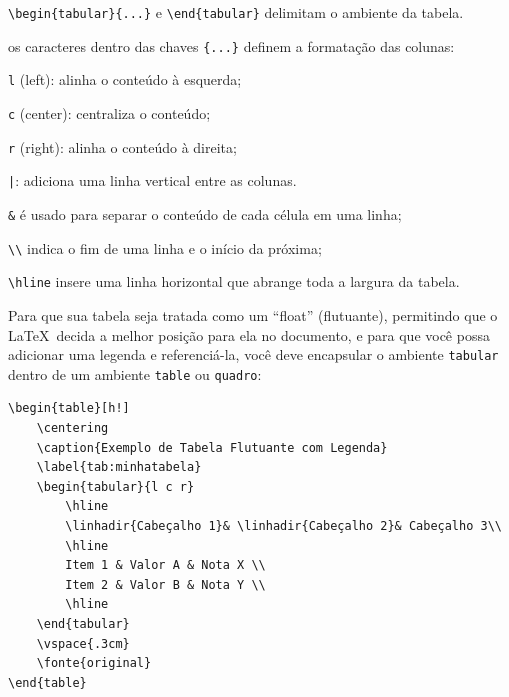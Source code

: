 \begin{alineas}
	\item \texttt{\textbackslash begin\{tabular\}\{...\}} e \texttt{\textbackslash end\{tabular\}} delimitam o ambiente da tabela.
	\item os caracteres dentro das chaves \texttt{\{...\}} definem a formatação das colunas:
	\begin{alineas}
		\item \texttt{l} (left): alinha o conteúdo à esquerda;
		\item \texttt{c} (center): centraliza o conteúdo;
		\item \texttt{r} (right): alinha o conteúdo à direita;
		\item \texttt{|}: adiciona uma linha vertical entre as colunas.
	\end{alineas}
	\item \texttt{\&} é usado para separar o conteúdo de cada célula em uma linha;
	\item \texttt{\textbackslash\textbackslash} indica o fim de uma linha e o início da próxima;
	\item \texttt{\textbackslash hline} insere uma linha horizontal que abrange toda a largura da tabela.
\end{alineas}

\vspace{\baselineskip}

Para que sua tabela seja tratada como um ``float'' (flutuante), permitindo que o \LaTeX\  decida a melhor posição para ela no documento, e para que você possa adicionar uma legenda e referenciá-la, você deve encapsular o ambiente \texttt{tabular} dentro de um ambiente \texttt{table} ou \texttt{quadro}:

\begin{lstlisting}[language={[LaTeX]TeX}]
\begin{table}[h!]
	\centering
	\caption{Exemplo de Tabela Flutuante com Legenda}
	\label{tab:minhatabela}
	\begin{tabular}{l c r}
		\hline
		\linhadir{Cabeçalho 1}& \linhadir{Cabeçalho 2}& Cabeçalho 3\\
		\hline
		Item 1 & Valor A & Nota X \\
		Item 2 & Valor B & Nota Y \\
		\hline
	\end{tabular}
	\vspace{.3cm}
	\fonte{original}
\end{table}
\end{lstlisting}


